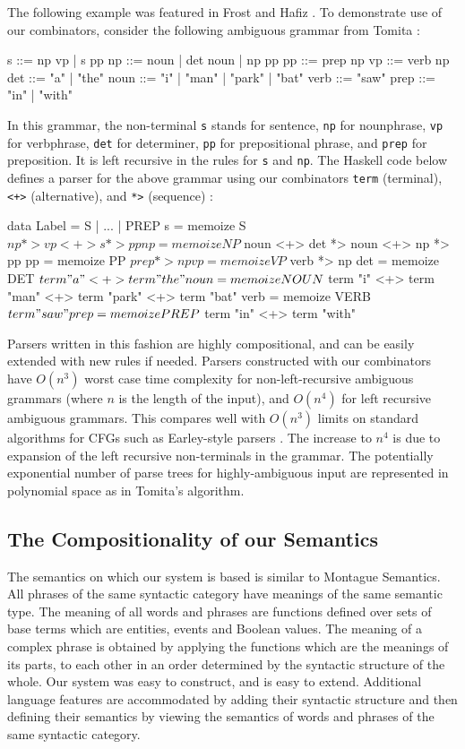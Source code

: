 \documentclass[../main.tex]{subfiles}
\begin{document}
\begin{refsection}
The following example was featured in Frost and Hafiz \cite{frosthafiz2008}. To demonstrate use of our combinators, consider the following ambiguous grammar from Tomita \cite{tomita1985}:
\begin{code}
	s    ::= np vp | s pp    np   ::= noun  | det noun | np pp
	pp   ::= prep np         vp   ::= verb np
	det  ::= "a"   | "the"   noun ::= "i"   | "man" | "park" | "bat"
	verb ::= "saw"           prep ::= "in"  | "with"
\end{code}
In this grammar, the non-terminal \texttt{s} stands for sentence, \texttt{np} for nounphrase, \texttt{vp} for verbphrase, \texttt{det} for determiner, \texttt{pp} for prepositional phrase, and \texttt{prep} for preposition.  It is left recursive in the rules for \texttt{s} and \texttt{np}.
The Haskell code below defines a parser for the above grammar using our combinators \texttt{term} (terminal), \texttt{<+>} (alternative), and \texttt{*>} (sequence) \cite{frost2008parser}:
\begin{code}
	data Label = S | ... | PREP
	s    = memoize S    $ np *> vp <+> s *> pp
	np   = memoize NP   $ noun <+> det *> noun <+> np *> pp
	pp   = memoize PP   $ prep *> np
	vp   = memoize VP   $ verb *> np
	det  = memoize DET  $ term "a" <+> term "the"
	noun = memoize NOUN
	$ term "i" <+> term "man" <+> term "park" <+> term "bat"
	verb = memoize VERB $ term "saw"
	prep = memoize PREP $ term "in" <+> term "with"
\end{code}
Parsers written in this fashion are highly compositional, and can be easily extended with new rules if needed.  Parsers constructed with our combinators have $O(n^3)$ worst case time complexity for non-left-recursive ambiguous  grammars (where $n$ is the  length of the input), and $O(n^4)$ for left recursive ambiguous grammars.  This compares well with $O(n^3)$ limits on standard algorithms for CFGs such as Earley-style parsers \cite{earley1970}.  The increase to $n^4$ is due to expansion  of  the  left  recursive non-terminals in the  grammar. The potentially exponential number of parse trees for highly-ambiguous input are represented in polynomial space as in Tomita’s algorithm.

\subsection{The Compositionality of our Semantics}

The semantics on which our system is based is similar to Montague Semantics. All phrases of the same syntactic category have meanings of the same semantic type. The meaning of all words and phrases are functions defined over sets of base terms which are entities, events and Boolean values. The meaning of a complex phrase is obtained by applying the functions which are the meanings of its parts, to each other in an order determined by the syntactic structure of the whole. Our system was easy to construct, and is easy to extend. Additional language features are accommodated by adding their syntactic structure and then defining their semantics by viewing the semantics of words and phrases of the same syntactic category.



\end{refsection}
\end{document}
